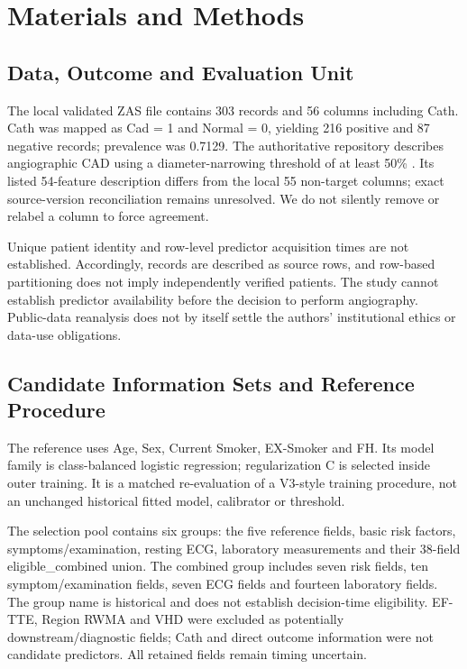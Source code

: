 \documentclass[conference]{IEEEtran}
\begin{document}
\section{Materials and Methods}
\subsection{Data, Outcome and Evaluation Unit}
The local validated ZAS file contains 303 records and 56 columns including Cath. Cath was mapped as Cad = 1 and Normal = 0, yielding 216 positive and 87 negative records; prevalence was 0.7129. The authoritative repository describes angiographic CAD using a diameter-narrowing threshold of at least 50\% \cite{r3}. Its listed 54-feature description differs from the local 55 non-target columns; exact source-version reconciliation remains unresolved. We do not silently remove or relabel a column to force agreement.

Unique patient identity and row-level predictor acquisition times are not established. Accordingly, records are described as source rows, and row-based partitioning does not imply independently verified patients. The study cannot establish predictor availability before the decision to perform angiography. Public-data reanalysis does not by itself settle the authors' institutional ethics or data-use obligations.

\subsection{Candidate Information Sets and Reference Procedure}
The reference uses Age, Sex, Current Smoker, EX-Smoker and FH. Its model family is class-balanced logistic regression; regularization C is selected inside outer training. It is a matched re-evaluation of a V3-style training procedure, not an unchanged historical fitted model, calibrator or threshold.

The selection pool contains six groups: the five reference fields, basic risk factors, symptoms/examination, resting ECG, laboratory measurements and their 38-field eligible\_combined union. The combined group includes seven risk fields, ten symptom/examination fields, seven ECG fields and fourteen laboratory fields. The group name is historical and does not establish decision-time eligibility. EF-TTE, Region RWMA and VHD were excluded as potentially downstream/diagnostic fields; Cath and direct outcome information were not candidate predictors. All retained fields remain timing uncertain.
\end{document}
